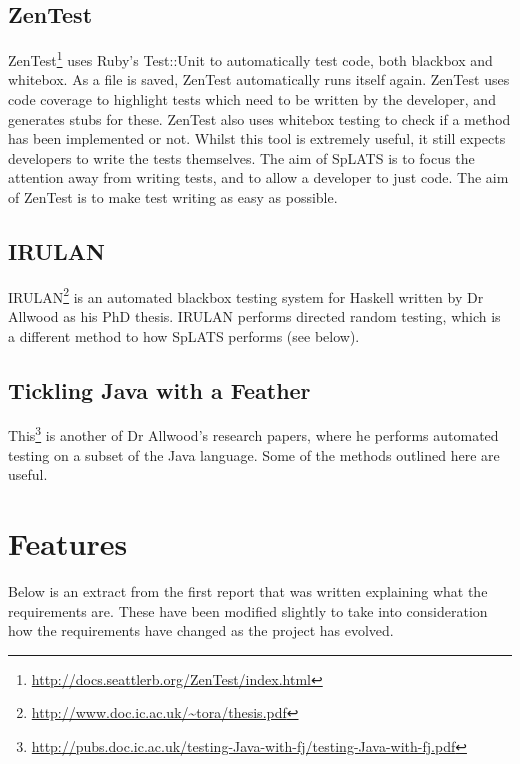   \subsection{ZenTest}
    ZenTest\footnote{\url{http://docs.seattlerb.org/ZenTest/index.html}} uses Ruby's Test::Unit to automatically test code, both blackbox and whitebox.
    As a file is saved, ZenTest automatically runs itself again.
    ZenTest uses code coverage to highlight tests which need to be written by the developer, and generates stubs for these.
    ZenTest also uses whitebox testing to check if a method has been implemented or not.
    Whilst this tool is extremely useful, it still expects developers to write the tests themselves.
    The aim of SpLATS is to focus the attention away from writing tests, and to allow a developer to just code.
    The aim of ZenTest is to make test writing as easy as possible.

  \subsection{IRULAN}
    IRULAN\footnote{\url{http://www.doc.ic.ac.uk/~tora/thesis.pdf}} is an automated blackbox testing system for Haskell written by Dr Allwood as his PhD thesis.
    IRULAN performs directed random testing, which is a different method to how SpLATS performs (see below).

  \subsection{Tickling Java with a Feather}
    This\footnote{\url{http://pubs.doc.ic.ac.uk/testing-Java-with-fj/testing-Java-with-fj.pdf}} is another of Dr Allwood's research papers, where he performs automated testing on a subset of the Java language.
    Some of the methods outlined here are useful.

\section{Features}
  Below is an extract from the first report that was written explaining what the requirements are.
  These have been modified slightly to take into consideration how the requirements have changed as the project has evolved.
